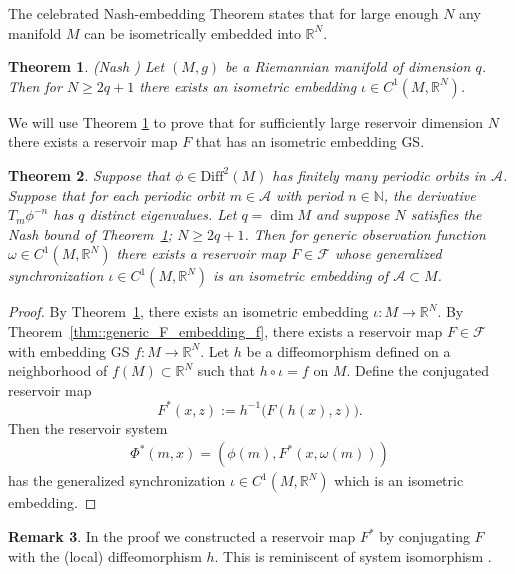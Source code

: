 \documentclass{article}
\newtheorem{theorem}{Theorem}
\theoremstyle{definition}
\theoremstyle{definition}
\newtheorem{remark}[theorem]{Remark}
\numberwithin{theorem}{section}
\begin{document}
The celebrated Nash-embedding Theorem states that for large enough $N$ any manifold $M$ can be isometrically embedded into $\mathbb{R}^N$.

\begin{theorem}
\label{thm::nash_embedding}
    (Nash \cite{nash1954}\cite{delellis2016masterpieces}) Let $(M,g)$ be a Riemannian manifold of dimension $q$. Then for $N \geq 2q+1$
    there exists an isometric embedding $\iota \in C^1(M,\mathbb{R}^N)$.
\end{theorem}

We will use Theorem \ref{thm::nash_embedding} to prove that for sufficiently large reservoir dimension $N$ there exists a reservoir map $F$ that has an isometric embedding GS.

\begin{theorem}
\label{thm:exist_isometric_GS}
Suppose that $\phi \in \mathrm{Diff}^2(M)$ has finitely many periodic orbits in $\mathcal{A}$. Suppose that for each periodic orbit $m \in \mathcal{A}$ with period $n \in \mathbb{N}$, the derivative $T_m \phi^{-n}$ has $q$ distinct eigenvalues.
Let $q=\dim M$ and suppose $N$ satisfies the Nash bound of Theorem~\ref{thm::nash_embedding}; $N \geq 2q + 1$.
Then for generic observation function $\omega \in C^1(M,\mathbb{R}^N)$ there exists a reservoir map $F \in \mathcal{F}$ whose generalized synchronization 
$\iota \in C^1(M,\mathbb{R}^N)$ is an isometric embedding of $\mathcal{A}\subset M$.
\end{theorem}

\begin{proof}
By Theorem~\ref{thm::nash_embedding}, there exists an isometric embedding $\iota : M \to \mathbb{R}^N$.
By Theorem~\ref{thm::generic_F_embedding_f}, there exists a reservoir map $F\in\mathcal{F}$ with embedding GS $f : M\to \mathbb{R}^N$.
Let $h$ be a diffeomorphism defined on a neighborhood of $f(M) \subset \mathbb{R}^N$ such that 
$h\circ \iota = f$ on $M$.
Define the conjugated reservoir map
\[
F^*(x,z) := h^{-1}\big(F(h(x),z)\big).
\]
Then the reservoir system
\begin{align*}
    \Phi^*(m,x) = (\phi(m),F^*(x,\omega(m)))
\end{align*}
has the generalized synchronization $\iota \in C^1(M,\mathbb{R}^N)$ which is an isometric embedding.
\end{proof}

\begin{remark}
In the proof we constructed a reservoir map $F^*$ by conjugating $F$ with the (local) diffeomorphism $h$. This is reminiscent of system isomorphism \cite{Tsuda1992} \cite{GrigoryevaOrtega2021} \cite{Grigoryeva2023}.
\end{remark}
\end{document}
